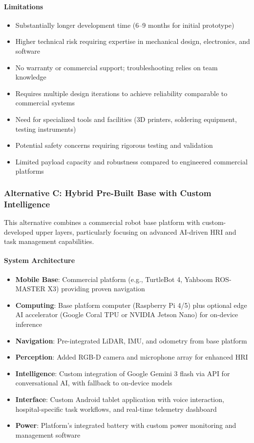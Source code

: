 \paragraph{Limitations}
\begin{itemize}
    \item Substantially longer development time (6--9 months for initial prototype)
    \item Higher technical risk requiring expertise in mechanical design, electronics, and software
    \item No warranty or commercial support; troubleshooting relies on team knowledge
    \item Requires multiple design iterations to achieve reliability comparable to commercial systems
    \item Need for specialized tools and facilities (3D printers, soldering equipment, testing instruments)
    \item Potential safety concerns requiring rigorous testing and validation
    \item Limited payload capacity and robustness compared to engineered commercial platforms
\end{itemize}

\subsubsection{Alternative C: Hybrid Pre-Built Base with Custom Intelligence}
This alternative combines a commercial robot base platform with custom-developed upper layers, particularly focusing on advanced AI-driven HRI and task management capabilities.

\paragraph{System Architecture}
\begin{itemize}
    \item \textbf{Mobile Base}: Commercial platform (e.g., TurtleBot 4, Yahboom ROS-MASTER X3) providing proven navigation
    \item \textbf{Computing}: Base platform computer (Raspberry Pi 4/5) plus optional edge AI accelerator (Google Coral TPU or NVIDIA Jetson Nano) for on-device inference
    \item \textbf{Navigation}: Pre-integrated LiDAR, IMU, and odometry from base platform
    \item \textbf{Perception}: Added RGB-D camera and microphone array for enhanced HRI
    \item \textbf{Intelligence}: Custom integration of Google Gemini 3 flash via API for conversational AI, with fallback to on-device models
    \item \textbf{Interface}: Custom Android tablet application with voice interaction, hospital-specific task workflows, and real-time telemetry dashboard
    \item \textbf{Power}: Platform's integrated battery with custom power monitoring and management software
\end{itemize}

